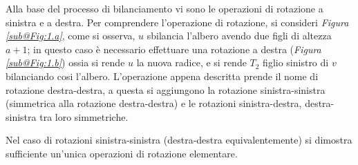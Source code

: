 \documentclass{subfiles}
\begin{document}
Alla base del processo di bilanciamento vi sono le operazioni di rotazione a sinistra e a destra.
Per comprendere l'operazione di rotazione, si consideri \emph{Figura \ref{sub@Fig:1.a}}, come si osserva, \(u\) sbilancia l'albero avendo due figli di altezza \(a + 1\);
in questo caso è necessario effettuare una rotazione a destra (\emph{Figura \ref{sub@Fig:1.b}}) ossia si rende \(u\) la nuova radice,
e si rende \(T_{2}\) figlio sinistro di \(v\) bilanciando cosi l'albero. L'operazione appena descritta prende il nome di rotazione destra-destra,
a questa si aggiungono la rotazione sinistra-sinistra (simmetrica alla rotazione destra-destra) e le rotazioni sinistra-destra, destra-sinistra tra loro simmetriche.


\begin{Remark*}
    Nel caso di rotazioni sinistra-sinistra (destra-destra equivalentemente) si dimostra sufficiente un'unica operazioni di rotazione elementare.
\end{Remark*}
\end{document}
